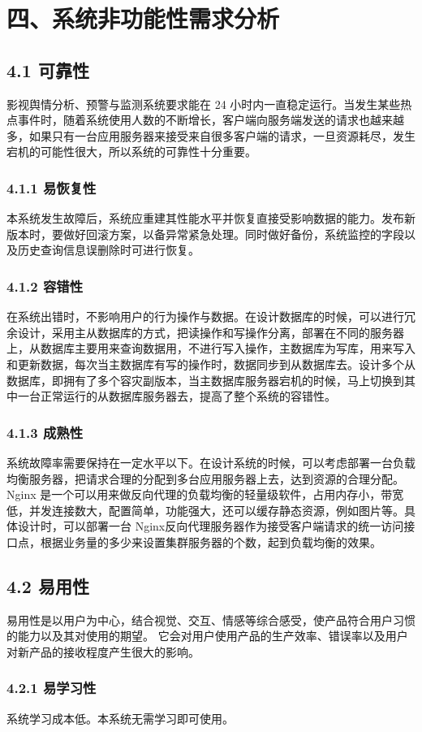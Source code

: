 \section{四、系统非功能性需求分析}
\subsection{4.1 可靠性}
影视舆情分析、预警与监测系统要求能在 24 小时内一直稳定运行。当发生某些热点事件时，随着系统使用人数的不断增长，客户端向服务端发送的请求也越来越多，如果只有一台应用服务器来接受来自很多客户端的请求，一旦资源耗尽，发生宕机的可能性很大，所以系统的可靠性十分重要。
\subsubsection{4.1.1 易恢复性}
本系统发生故障后，系统应重建其性能水平并恢复直接受影响数据的能力。发布新版本时，要做好回滚方案，以备异常紧急处理。同时做好备份，系统监控的字段以及历史查询信息误删除时可进行恢复。
\subsubsection{4.1.2 容错性}
在系统出错时，不影响用户的行为操作与数据。在设计数据库的时候，可以进行冗余设计，采用主从数据库的方式，把读操作和写操作分离，部署在不同的服务器上，从数据库主要用来查询数据用，不进行写入操作，主数据库为写库，用来写入和更新数据，每次当主数据库有写的操作时，数据同步到从数据库去。设计多个从数据库，即拥有了多个容灾副版本，当主数据库服务器宕机的时候，马上切换到其中一台正常运行的从数据库服务器去，提高了整个系统的容错性。
\subsubsection{4.1.3 成熟性}
系统故障率需要保持在一定水平以下。在设计系统的时候，可以考虑部署一台负载均衡服务器，把请求合理的分配到多台应用服务器上去，达到资源的合理分配。Nginx 是一个可以用来做反向代理的负载均衡的轻量级软件，占用内存小，带宽低，并发连接数大，配置简单，功能强大，还可以缓存静态资源，例如图片等。具体设计时，可以部署一台 Nginx反向代理服务器作为接受客户端请求的统一访问接口点，根据业务量的多少来设置集群服务器的个数，起到负载均衡的效果。
\subsection{4.2 易用性}
易用性是以用户为中心，结合视觉、交互、情感等综合感受，使产品符合用户习惯的能力以及其对使用的期望。 它会对用户使用产品的生产效率、错误率以及用户对新产品的接收程度产生很大的影响。
\subsubsection{4.2.1 易学习性}
系统学习成本低。本系统无需学习即可使用。
